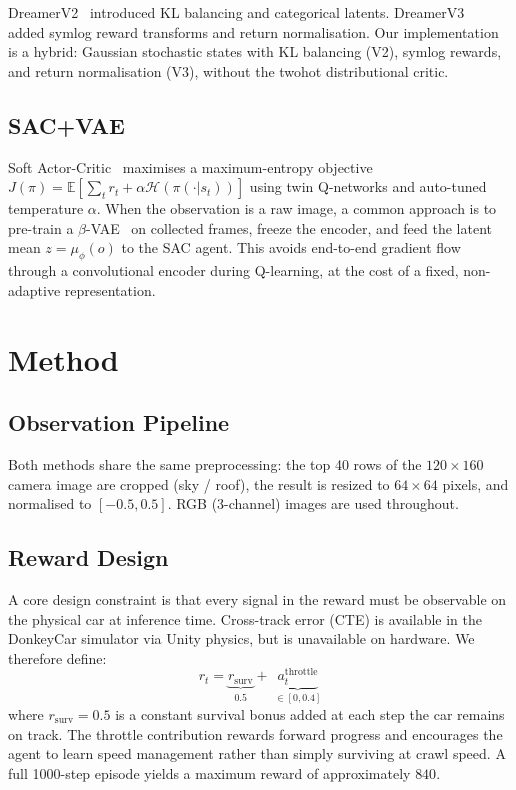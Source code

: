 \documentclass[10pt,twocolumn]{article}
\begin{document}
DreamerV2~\cite{hafner2020dreamerv2} introduced KL balancing and
categorical latents. DreamerV3~\cite{hafner2023dreamerv3} added symlog
reward transforms and return normalisation. Our implementation is a hybrid:
Gaussian stochastic states with KL balancing (V2), symlog rewards, and return
normalisation (V3), without the twohot distributional critic.

\subsection{SAC+VAE}
Soft Actor-Critic~\cite{haarnoja2018sac} maximises a maximum-entropy objective
$J(\pi) = \mathbb{E}[\sum_t r_t + \alpha \mathcal{H}(\pi(\cdot|s_t))]$
using twin Q-networks and auto-tuned temperature $\alpha$.
When the observation is a raw image, a common approach is to pre-train
a $\beta$-VAE~\cite{higgins2017betavae} on collected frames, freeze the encoder,
and feed the latent mean $z = \mu_\phi(o)$ to the SAC agent.
This avoids end-to-end gradient flow through a convolutional encoder during
Q-learning, at the cost of a fixed, non-adaptive representation.

\section{Method}

\subsection{Observation Pipeline}
Both methods share the same preprocessing: the top 40 rows of the
$120\times160$ camera image are cropped (sky / roof), the result is
resized to $64\times64$ pixels, and normalised to $[-0.5, 0.5]$.
RGB (3-channel) images are used throughout.

\subsection{Reward Design}
\label{sec:reward}

A core design constraint is that every signal in the reward must be
observable on the physical car at inference time.
Cross-track error (CTE) is available in the DonkeyCar simulator
via Unity physics, but is unavailable on hardware.
We therefore define:
\[
  r_t = \underbrace{r_\text{surv}}_{\text{0.5}} +\; \underbrace{a_t^\text{throttle}}_{\in[0,0.4]}
\]
where $r_\text{surv}=0.5$ is a constant survival bonus added at each step
the car remains on track.
The throttle contribution rewards forward progress and encourages the agent
to learn speed management rather than simply surviving at crawl speed.
A full 1000-step episode yields a maximum reward of approximately $840$.
\end{document}
